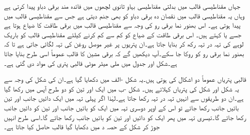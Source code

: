 جہاں مقناطیسی قالب میں بدلتی مقناطیسی بہاو ثانوی لچھوں میں فائدہ مند برقی دباو پیدا کرتی ہے وہاں یہ مقناطیسی قالب میں نقصان دہ برقی دباو کو بھی جنم دیتی ہے جس سے مقناطیسی قالب میں  پیدا ہوتی ہے۔ اس بھنور نما برقی رو کی وجہ سے مقناطیسی قالب میں برقی طاقت کا ضیاع ہوتا ہے جسے   یا  کہتے ہیں۔ اس برقی طاقت  کے ضیاع کو کم سے کم کرنے کیلئے مقناطیسی قالب کو  باریک لوہے کی  تہہ در تہہ رکھ کر بنایا جاتا ہے۔ان پتریوں پر غیر موصل روغن کی تہہ لگائی جاتی ہے تا کہ بھنور نما برقی رو کو روکا جا سکے۔آپ دیکھیں گے کہ برقی مشین کا قالب عموماً اسی طرح بنایا جاتا ہے۔شکل  اور جدول   میں  ملی میٹر موٹی  قالبی پتری کی  مواد دی گئی ہے۔

قالبی پتریاں عموماً دو اشکال کی ہوتی ہیں۔یہ شکل -الف میں دکھایا گیا ہے۔ان کی شکل کی وجہ سے یہ  شکل اور  شکل کی پتریاں کہلاتے ہیں۔ شکل -ب میں ایک اور تین  کو دو طرح آپس میں رکھا گیا ہے۔ان دو طریقوں سے انہیں تہہ در تہہ رکھا جاتا ہے۔لہٰذا اگر پہلی تہہ میں ایک دائیں جانب اور تین بائیں جانب رکھا جائے تو اس کے اوپر دوسری تہہ میں ایک کو بائیں جانب اور تین کو دائیں جانب رکھا جائے گا۔تیسری تہہ میں پھر ایک کو دائیں اور تین کو بائیں جانب رکھا جائے گا۔اسی طرح انہیں جوڑ کر شکل کے حصہ د میں دکھایا گیا قالب حاصل کیا جاتا ہے۔

